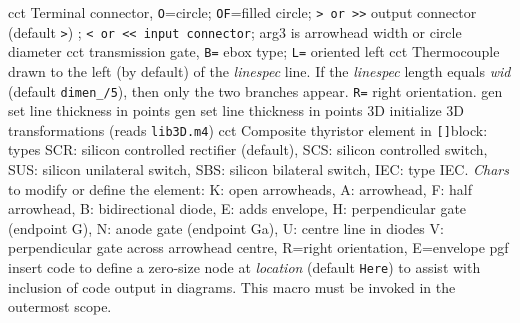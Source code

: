   {cct}
  {Terminal connector, {\tt O}=circle; {\tt OF}=filled circle;
   {\tt > or >>} output connector
   (default {\tt >}) ;
   {\tt < or << input connector}; arg3 is arrowhead width or circle diameter 
    }
  {cct}
  {transmission gate, {\tt B=} ebox type; {\tt L=} oriented left
    }
  {cct}
  { Thermocouple drawn to the left (by default) of the {\sl linespec}
    line.  If the {\sl linespec} length equals {\sl wid}
    (default {\tt dimen\_/5}), then only the two branches appear. 
    {\tt R=} right orientation.
    }
  {gen}
  {set line thickness in points}
  {gen}
  {set line thickness in points}
  {3D}
  {initialize 3D transformations (reads {\tt lib3D.m4})}
  {cct}
  {Composite thyristor element in {\tt []}block:
   types
                                   SCR: silicon controlled rectifier (default),
                                   SCS: silicon controlled switch,
                                   SUS: silicon unilateral switch,
                                   SBS: silicon bilateral switch,
                                   IEC: type IEC.
   {\sl Chars} to modify or define the element:
                                   K: open arrowheads,
                                   A: arrowhead,
                                   F: half arrowhead,
                                   B: bidirectional diode,
                                   E: adds envelope,
                                   H: perpendicular gate (endpoint G),
                                   N: anode gate (endpoint Ga),
                                   U: centre line in diodes
                                 V: perpendicular gate across arrowhead centre,
                                   R=right orientation,
                                   E=envelope
    }
  {pgf}
  {insert \Tikz code to define a zero-size \Tikz node at {\sl location}
    (default {\tt Here}) to assist with inclusion of \pic code output in
    \Tikz diagrams.  This macro must be invoked in the outermost \pic scope.
    }
